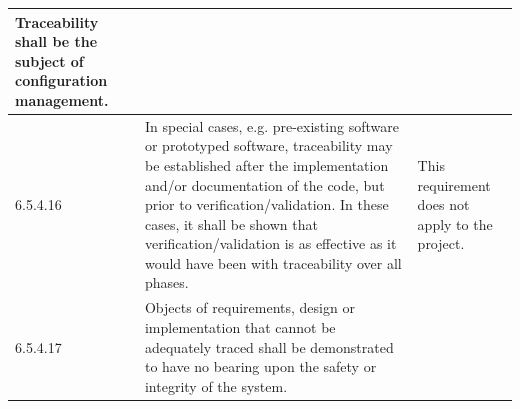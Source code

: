 \documentclass{template/openetcs_report}
\begin{document}
{\begin{longtable}{||p{}|p{}|p{}||}
    Traceability shall be the subject of configuration management.  &
    \\
    \hline 6.5.4.16 & In special cases, e.g. pre-existing software or
    prototyped software, traceability may be established after the
    implementation and/or documentation of the code, but prior to
    verification/validation.  In these cases, it shall be shown that
    verification/validation is as effective as it would have been with
    traceability over all phases.  & This requirement does not apply to
    the project.
    \\
    \hline 6.5.4.17 & Objects of requirements, design or
    implementation that cannot be adequately traced shall be
    demonstrated to have no bearing upon the safety or integrity of
    the system.  &
    \\
    \hline
\end{longtable}}
\end{document}
